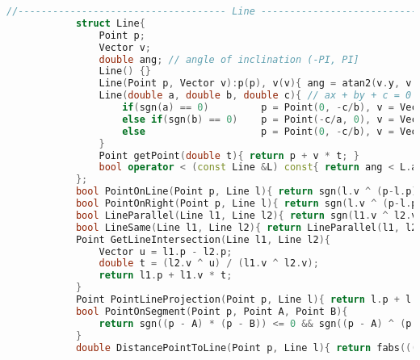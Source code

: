 \documentclass[withoutpreface,bwprint,fontset=macnew]{cumcmthesis} %
\begin{document}
\begin{appendices}
\begin{lstlisting}[language=c++]
			//------------------------------------ Line ------------------------------------//
			struct Line{
				Point p;
				Vector v;
				double ang; // angle of inclination (-PI, PI]
				Line() {}
				Line(Point p, Vector v):p(p), v(v){ ang = atan2(v.y, v.x); }
				Line(double a, double b, double c){ // ax + by + c = 0
					if(sgn(a) == 0)         p = Point(0, -c/b), v = Vector(1, 0);
					else if(sgn(b) == 0)    p = Point(-c/a, 0), v = Vector(0, 1);
					else                    p = Point(0, -c/b), v = Vector(-b, a);
				}
				Point getPoint(double t){ return p + v * t; }
				bool operator < (const Line &L) const{ return ang < L.ang; }
			};
			bool PointOnLine(Point p, Line l){ return sgn(l.v ^ (p-l.p)) == 0; }
			bool PointOnRight(Point p, Line l){ return sgn(l.v ^ (p-l.p)) < 0; }
			bool LineParallel(Line l1, Line l2){ return sgn(l1.v ^ l2.v) == 0; }
			bool LineSame(Line l1, Line l2){ return LineParallel(l1, l2) && sgn((l1.p-l2.p) ^ l1.v) == 0; }
			Point GetLineIntersection(Line l1, Line l2){
				Vector u = l1.p - l2.p;
				double t = (l2.v ^ u) / (l1.v ^ l2.v);
				return l1.p + l1.v * t;
			}
			Point PointLineProjection(Point p, Line l){ return l.p + l.v * ((l.v * (p - l.p)) / (l.v * l.v)); }
			bool PointOnSegment(Point p, Point A, Point B){
				return sgn((p - A) * (p - B)) <= 0 && sgn((p - A) ^ (p - B)) == 0;
			}
			double DistancePointToLine(Point p, Line l){ return fabs(((p - l.p) ^ l.v) / Length(l.v)); }
			

\end{lstlisting}
\end{appendices}
\end{document}
